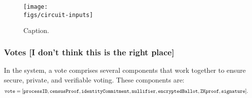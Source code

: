 

\begin{figure}[h]
	\centerline{\texttt{[image: \\figs/circuit-inputs]}}
	\caption{Caption.}
	\label{fig:circuit-inputs}
\end{figure}


\subsubsection{Votes [I don't think this is the right place]}

In the \davinci system, a vote comprises several components that work together to ensure secure, private, and verifiable voting. These components are:
\begin{align*}
		\texttt{vote} = [	\texttt{processID}, \texttt{censusProof}, \texttt{identityCommitment}, \texttt{nullifier},	
				 	\texttt{encryptedBallot}, \texttt{ZKproof}, \texttt{signature} ].
\end{align*}

